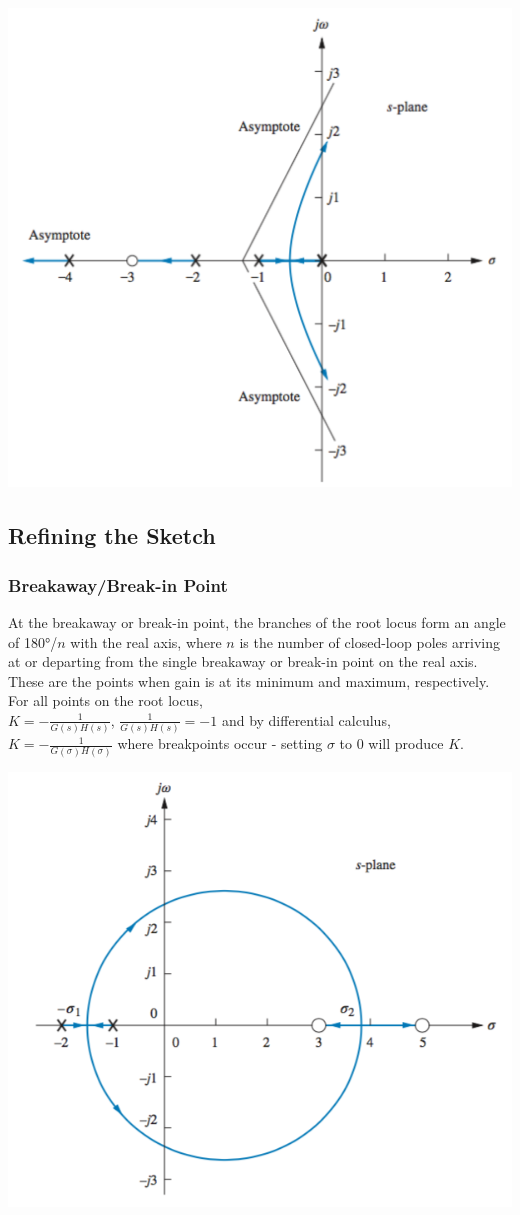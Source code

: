 \documentclass[11pt]{article}
\begin{document}
    \begin{center}
    \includegraphics[width=300 px]{img/asymptotes} \\
    \end{center}

    \subsection{Refining the Sketch}

    \subsubsection{Breakaway/Break-in Point}

    At the breakaway or break-in point, the branches of the root locus form an angle of 180°/$n$ with the real axis, where $n$ is the number of closed-loop poles arriving at or departing from the single breakaway or break-in point on the real axis. These are the points when gain is at its minimum and maximum, respectively. \\
        
    For all points on the root locus, \\
    
    $K = -\frac{1}{G(s)H(s)}$, $\frac{1}{G(s)H(s)} = -1$ and by differential calculus, \\
    
    $K = -\frac{1}{G(\sigma)H(\sigma)}$ where breakpoints occur - setting $\sigma$ to 0 will produce $K$.

    \begin{center}
        \includegraphics[width=300 px]{img/breakpoints} \\
    \end{center}
\end{document}

